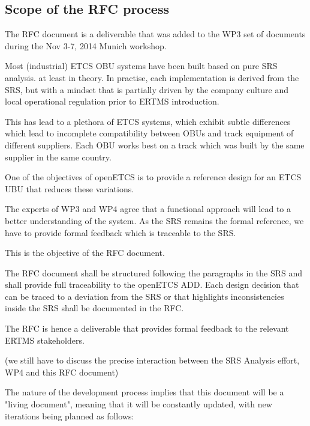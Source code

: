 \subsection{Scope of the RFC process}

The RFC document is a deliverable that was added to the WP3 set of documents during the Nov 3-7, 2014 Munich workshop.

Most (industrial) ETCS OBU systems have been built based on pure SRS analysis. at least in theory. In practise, each implementation is derived from the SRS, but with a mindset that is partially driven by the company culture and local operational regulation prior to ERTMS introduction.

This has lead to a plethora of ETCS systems, which exhibit subtle differences which lead to incomplete compatibility between OBUs and track equipment of different suppliers. Each OBU works best on a track which was built by the same supplier in the same country.

One of the objectives of openETCS is to provide a reference design for an ETCS UBU that reduces these variations.

The experts of WP3 and WP4 agree that a functional approach will lead to a better understanding of the system. As the SRS remains the formal reference, we have to provide formal feedback which is traceable to the SRS.

This is the objective of the RFC document.

The RFC document shall be structured following the paragraphs in the SRS and shall provide full traceability to the openETCS ADD.
Each design decision that can be traced to a deviation from the SRS or that highlights inconsistencies inside the SRS shall be documented in the RFC.

The RFC is hence a deliverable that provides formal feedback to the relevant ERTMS stakeholders.

(we still have to discuss the precise interaction between the SRS Analysis effort, WP4 and this RFC document)

The nature of the development process implies that this document will be a "living document", meaning that it will be constantly updated, with new iterations being planned as follows:

